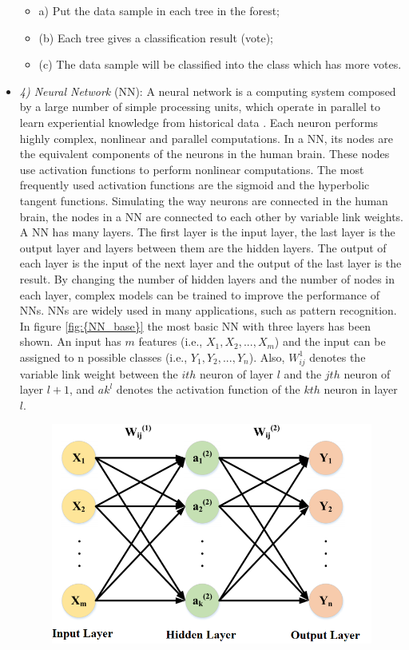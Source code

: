 \begin{itemize}
\begin{itemize}
\item[]a) Put the data sample in each tree in the forest;
\item[](b) Each tree gives a classification result (vote);
\item[](c) The data sample will be classified into the class which has more votes.
\end{itemize}
\item[]\textit{4) Neural Network} (NN): A neural network is a computing system composed by a large number of simple processing units, which operate in parallel to learn experiential knowledge from historical data \cite{Haykin}. Each neuron performs highly complex, nonlinear and parallel computations. In a NN, its nodes are the equivalent components of the neurons in the human brain. These nodes use activation functions to perform nonlinear computations. The most frequently used activation functions are the sigmoid and the hyperbolic tangent functions. Simulating the way neurons are connected in the human brain, the nodes in a NN are connected to each other by variable link weights.
A NN has many layers. The first layer is the input layer, the last layer is the output layer and layers between them are the hidden layers. The output of each layer is the input of the next layer and the output of the last layer is the result. By changing the number of hidden layers and the number of nodes in each layer, complex models can be trained to improve the performance of NNs. NNs are widely used in many applications, such as pattern recognition. In figure \ref{fig:{NN_base}} the most basic NN with three layers has been shown. An input has $m$ features (i.e., $X_{1},X_{2},...,X_{m}$) and the input can be assigned to n possible classes (i.e., $Y_{1},Y_{2},...,Y_{n}$). Also, $W_{ij}^{1}$ denotes the variable link weight between the $ith$ neuron of layer $l$ and the $jth$ neuron of layer $l + 1$, and $ak^{l}$ denotes the activation function of the $kth$ neuron in layer $l$.
\begin{figure}[tb!]
	\centering
	\includegraphics[width=13cm]{figure/NN_base.png}

\end{figure}
\end{itemize}
